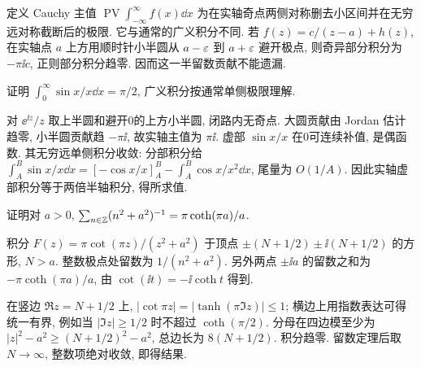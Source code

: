 定义 Cauchy 主值 $\operatorname{PV}\int_{-\infty}^\infty f(x)\dd x$ 为在实轴奇点两侧对称删去小区间并在无穷远对称截断后的极限. 它与通常的广义积分不同. 若 $f(z)=c/(z-a)+h(z)$, 在实轴点 $a$ 上方用顺时针小半圆从 $a-\varepsilon$ 到 $a+\varepsilon$ 避开极点, 则奇异部分积分为 $-\pi\ii c$, 正则部分积分趋零. 因而这一半留数贡献不能遗漏.
\begin{example}
证明 $\int_0^\infty\sin x/x\dd x=\pi/2$, 广义积分按通常单侧极限理解.
\end{example}
\begin{solution}
对 $\ee^{\ii z}/z$ 取上半圆和避开0的上方小半圆, 闭路内无奇点. 大圆贡献由 Jordan 估计趋零, 小半圆贡献趋 $-\pi\ii$, 故实轴主值为 $\pi\ii$. 虚部 $\sin x/x$ 在0可连续补值, 是偶函数. 其无穷远单侧积分收敛: 分部积分给 $\int_A^B\sin x/x\dd x=[-\cos x/x]_A^B-\int_A^B\cos x/x^2\dd x$, 尾量为 $O(1/A)$. 因此实轴虚部积分等于两倍半轴积分, 得所求值.
\end{solution}

\begin{example}
证明对 $a>0$, $\sum_{n\in\mathbb Z}(n^2+a^2)^{-1}=\pi\coth(\pi a)/a$.
\end{example}
\begin{solution}
积分 $F(z)=\pi\cot(\pi z)/(z^2+a^2)$ 于顶点 $\pm(N+1/2)\pm\ii(N+1/2)$ 的方形, $N>a$. 整数极点处留数为 $1/(n^2+a^2)$. 另外两点 $\pm\ii a$ 的留数之和为 $-\pi\coth(\pi a)/a$, 由 $\cot(\ii t)=-\ii\coth t$ 得到.

在竖边 $\Re z=N+1/2$ 上, $|\cot\pi z|=|\tanh(\pi\Im z)|\le1$; 横边上用指数表达可得统一有界, 例如当 $|\Im z|\ge1/2$ 时不超过 $\coth(\pi/2)$. 分母在四边模至少为 $|z|^2-a^2\ge(N+1/2)^2-a^2$, 总边长为 $8(N+1/2)$. 积分趋零. 留数定理后取 $N\to\infty$, 整数项绝对收敛, 即得结果.
\end{solution}

